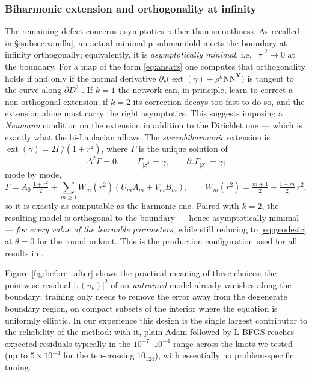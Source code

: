 \documentclass[oneside,british]{amsart}
\numberwithin{equation}{section}
\numberwithin{figure}{section}
\theoremstyle{plain}
\numberwithin{thm}{section}
\theoremstyle{plain}
\theoremstyle{plain}
\theoremstyle{definition}
\theoremstyle{remark}
\DeclareMathOperator{\ext}{\mathrm{ext}}
\newcommand{\NN}{\mathrm{NN}}
\begin{document}
\subsubsection*{Biharmonic extension and orthogonality at
infinity}
The remaining defect concerns asymptotics rather than smoothness. As
recalled in \S\ref{subsec:vanilla}, an actual minimal p-submanifold
meets the boundary at infinity orthogonally; equivalently, it is
\emph{asymptotically minimal}, i.e.\ $|\tau|^{2}\to0$ at the boundary.
For a map of the form \eqref{eq:ansatz} one computes that orthogonality
holds if and only if the normal derivative
$\partial_{r}\bigl(\ext(\gamma)+\rho^{k}\NN^{\boldsymbol{Y}}\bigr)$ is
tangent to the curve along $\partial D^{2}$
\cite[\S3.2]{SchettiniUsula2026}. If $k=1$ the network can, in
principle, learn to correct a non-orthogonal extension; if $k=2$ its
correction decays too fast to do so, and the extension alone must carry
the right asymptotics. This suggests imposing a \emph{Neumann}
condition on the extension in addition to the Dirichlet one --- which
is exactly what the bi-Laplacian allows. The \emph{stereobiharmonic}
extension is $\ext(\gamma)=2\Gamma/(1+r^{2})$, where $\Gamma$ is the
unique solution of
\[
\Delta^{2}\Gamma=0,\qquad\Gamma_{|S^{1}}=\gamma,\qquad\partial_{r}\Gamma_{|S^{1}}=\gamma;
\]
mode by mode,
\[
\Gamma=A_{0}\,\tfrac{1+r^{2}}{2}+\sum_{m\ge1}W_{m}(r^{2})\left(U_{m}A_{m}+V_{m}B_{m}\right),\qquad W_{m}(r^{2})=\tfrac{m+1}{2}+\tfrac{1-m}{2}\,r^{2},
\]
so it is exactly as computable as the harmonic one. Paired with
$k=2$, the resulting model is orthogonal to the boundary --- hence
asymptotically minimal --- \emph{for every value of the learnable
parameters}, while still reducing to \eqref{eq:geodesic} at $\theta=0$
for the round unknot. This is the production configuration used for
all results in \cite{SchettiniUsula2026}.

Figure \ref{fig:before_after} shows the practical meaning of these
choices: the pointwise residual $|\tau(u_{\theta})|^{2}$ of an
\emph{untrained} model already vanishes along the boundary; training
only needs to remove the error away from the degenerate boundary
region, on compact subsets of the interior where the equation is
uniformly elliptic. In our experience this design is the single largest
contributor to the reliability of the method: with it, plain Adam
\cite{kingma2014adam} followed by L-BFGS \cite{liu1989limited} reaches
expected residuals typically in the $10^{-7}$--$10^{-4}$ range across
the knots we tested (up to $5\times10^{-4}$ for the ten-crossing
$10_{124}$), with essentially no problem-specific tuning.
\end{document}
